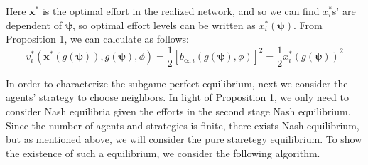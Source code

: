 \documentclass[12pt]{article}
\theoremstyle{definition}
\begin{document}
Here $\bm{x}^*$ is the optimal effort in the realized network, and so we can find $x_i^*$s' are dependent of $\bm{\psi}$, so optimal effort levels can be written as $x_i^*(\bm{\psi})$.
From Proposition 1, we can calculate as follows:
\begin{equation}
	\label{opteff}
	v_i^*(\bm{x}^*(g(\bm{\psi})), g(\bm{\psi}), \phi) = \frac{1}{2} {[b_{\bm{\alpha}, i}(g(\bm{\psi}), \phi)]}^2 = \frac{1}{2} {x_i^*(g(\bm{\psi}))}^2
\end{equation}

In order to characterize the subgame perfect equilibrium, next we consider the agents' strategy to choose neighbors.
In light of Proposition 1, we only need to consider Nash equilibria given the efforts in the second stage Nash equilibrium.
Since the number of agents and strategies is finite, there exists Nash equilibrium, but as mentioned above, we will consider the pure staretegy equilibrium.
To show the existence of such a equilibrium, we consider the following algorithm.
\end{document}
